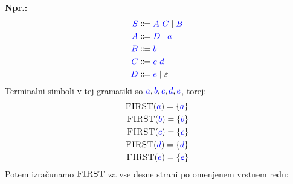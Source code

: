 \documentclass{article}
\newcommand{\Ex}{\textbf{Npr.:}\ }
\newcommand{\FIRST}{\textsc{FIRST}}
\newcommand{\Symbol}[1]{\textcolor{blue}{#1}}
\newcommand{\Null}{\varepsilon}
\newcommand{\Arrow}{\Coloneqq}
\newcommand{\Seq}{\ }
\newcommand{\Union}{\mathrel{|}}
\begin{document}
\Ex
\begin{equation*}
  \begin{aligned}
    \Symbol{S} &\Arrow \Symbol{A} \Seq \Symbol{C} \Union \Symbol{B} \\
    \Symbol{A} &\Arrow \Symbol{D} \Union \Symbol{a} \\
    \Symbol{B} &\Arrow \Symbol{b}\\
    \Symbol{C} &\Arrow \Symbol{c} \Seq \Symbol{d}\\
    \Symbol{D} &\Arrow \Symbol{e} \Union \Null
  \end{aligned}
\end{equation*}
Terminalni simboli v tej gramatiki so $\Symbol{a}, \Symbol{b}, \Symbol{c}, \Symbol{d}, \Symbol{e}$, torej:
\begin{align*}
  \FIRST(\Symbol{a}) = \{\Symbol{a}\}\\
  \FIRST(\Symbol{b}) = \{\Symbol{b}\}\\
  \FIRST(\Symbol{c}) = \{\Symbol{c}\}\\
  \FIRST(\Symbol{d}) = \{\Symbol{d}\}\\
  \FIRST(\Symbol{e}) = \{\Symbol{e}\}
\end{align*}
Potem izračunamo $\FIRST$ za vse desne strani po omenjenem vrstnem redu:
\end{document}
